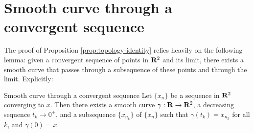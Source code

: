 \section{Smooth curve through a convergent sequence}

The proof of Proposition \ref{prop:topology-identity} relies heavily on the following lemma:
given a convergent sequence of points in $\mathbf{R}^2$ and its limit, there exists a smooth curve that passes through a subsequence of these points and through the limit.
Explicitly:

\begin{Article}{Smooth curve through a convergent sequence}{}
  \label{lem:smooth-curve}
  Let $\{x_n\}$ be a sequence in $\mathbf{R}^2$ converging to $x$.
  Then there exists a smooth curve $\gamma: \mathbf{R} \to \mathbf{R}^2$,
  a decreasing sequence $t_k \to 0^+$,
  and a subsequence $\{x_{n_k}\}$ of $\{x_n\}$
  such that $\gamma(t_k) = x_{n_k}$ for all $k$,
  and $\gamma(0)=x$.
\end{Article}

